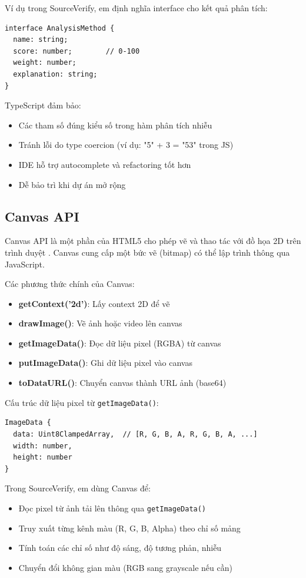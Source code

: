 Ví dụ trong SourceVerify, em định nghĩa interface cho kết quả phân tích:
\begin{verbatim}
interface AnalysisMethod {
  name: string;
  score: number;        // 0-100
  weight: number;
  explanation: string;
}
\end{verbatim}

TypeScript đảm bảo:
\begin{itemize}
  \item Các tham số đúng kiểu số trong hàm phân tích nhiễu
  \item Tránh lỗi do type coercion (ví dụ: "5" + 3 = "53" trong JS)
  \item IDE hỗ trợ autocomplete và refactoring tốt hơn
  \item Dễ bảo trì khi dự án mở rộng
\end{itemize}

\subsection{Canvas API}
Canvas API là một phần của HTML5 cho phép vẽ và thao tác với đồ họa 2D trên trình duyệt \cite{canvas}. Canvas cung cấp một bức vẽ (bitmap) có thể lập trình thông qua JavaScript.

Các phương thức chính của Canvas:
\begin{itemize}
  \item \textbf{getContext('2d')}: Lấy context 2D để vẽ
  \item \textbf{drawImage()}: Vẽ ảnh hoặc video lên canvas
  \item \textbf{getImageData()}: Đọc dữ liệu pixel (RGBA) từ canvas
  \item \textbf{putImageData()}: Ghi dữ liệu pixel vào canvas
  \item \textbf{toDataURL()}: Chuyển canvas thành URL ảnh (base64)
\end{itemize}

Cấu trúc dữ liệu pixel từ \texttt{getImageData()}:
\begin{verbatim}
ImageData {
  data: Uint8ClampedArray,  // [R, G, B, A, R, G, B, A, ...]
  width: number,
  height: number
}
\end{verbatim}

Trong SourceVerify, em dùng Canvas để:
\begin{itemize}
  \item Đọc pixel từ ảnh tải lên thông qua \texttt{getImageData()}
  \item Truy xuất từng kênh màu (R, G, B, Alpha) theo chỉ số mảng
  \item Tính toán các chỉ số như độ sáng, độ tương phản, nhiễu
  \item Chuyển đổi không gian màu (RGB sang grayscale nếu cần)
\end{itemize}

